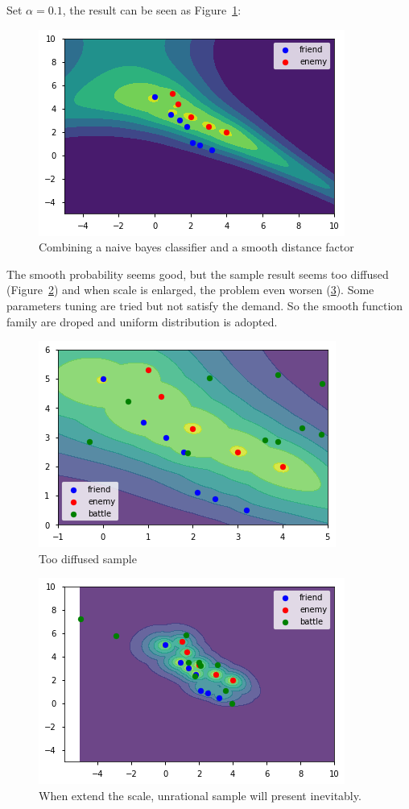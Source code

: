 \documentclass{article}
\begin{document}
Set $\alpha=0.1$, the result can be seen as Figure~\ref{fig:combOne}:

\begin{figure}[h!]
\includegraphics[width=0.6\linewidth]{comb1.png}
\caption{Combining a naive bayes classifier and a smooth distance factor}
\label{fig:combOne}
\end{figure}

The smooth probability seems good, but the sample result seems too diffused 
(Figure~\ref{fig:combTwo}) and when scale is enlarged, the problem even worsen (\ref{fig:combThree}).
Some parameters tuning are tried but not satisfy the demand. So the smooth function family are droped 
and uniform distribution is adopted. 

\begin{figure}[h!]
\includegraphics[width=0.6\linewidth]{comb2.png}
\caption{Too diffused sample}
\label{fig:combTwo}
\end{figure}

\begin{figure}[h!]
\includegraphics[width=0.6\linewidth]{comb4.png}
\caption{When extend the scale, unrational sample will present inevitably.}
\label{fig:combThree}
\end{figure}
\end{document}
